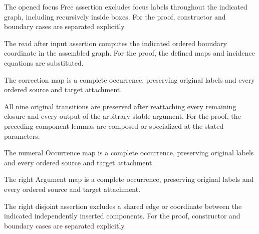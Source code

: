 The opened focus Free assertion excludes focus labels throughout the indicated graph, including recursively inside boxes.
For the proof, constructor and boundary cases are separated explicitly.
\par{}

The read after input assertion computes the indicated ordered boundary coordinate in the assembled graph.
For the proof, the defined maps and incidence equations are substituted.
\par{}

The correction map is a complete occurrence, preserving original labels and every ordered source and target attachment.
\par{}

All nine original transitions are preserved after reattaching every remaining closure and every output of the arbitrary stable argument.
For the proof, the preceding component lemmas are composed or specialized at the stated parameters.
\par{}

The numeral Occurrence map is a complete occurrence, preserving original labels and every ordered source and target attachment.
\par{}

The right Argument map is a complete occurrence, preserving original labels and every ordered source and target attachment.
\par{}

The right disjoint assertion excludes a shared edge or coordinate between the indicated independently inserted components.
For the proof, constructor and boundary cases are separated explicitly.
\par{}

